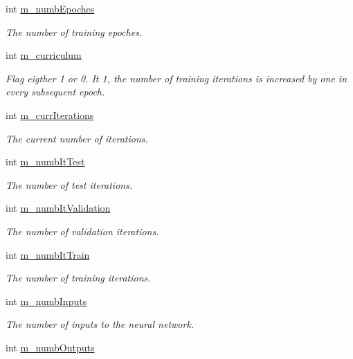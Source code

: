 \begin{DoxyCompactItemize}
int \hyperlink{classTrainingAlgorithm_aca4ca80f4bab494a8de2ea99c79b30d1}{m\+\_\+numb\+Epoches}
\begin{DoxyCompactList}\small\item\em The number of training epoches. \end{DoxyCompactList}\item 
int \hyperlink{classTrainingAlgorithm_ac00da5dcd2bf50277ef44e1543b9d919}{m\+\_\+curriculum}
\begin{DoxyCompactList}\small\item\em Flag eigther 1 or 0. It 1, the number of training iterations is increased by one in every subsequent epoch. \end{DoxyCompactList}\item 
int \hyperlink{classTrainingAlgorithm_a0b9caeb8ebd28c40838d1bd8b554d296}{m\+\_\+curr\+Iterations}
\begin{DoxyCompactList}\small\item\em The current number of iterations. \end{DoxyCompactList}\item 
int \hyperlink{classTrainingAlgorithm_a2f247e588d2c35a31f664a20b282ed8e}{m\+\_\+numb\+It\+Test}
\begin{DoxyCompactList}\small\item\em The number of test iterations. \end{DoxyCompactList}\item 
int \hyperlink{classTrainingAlgorithm_accfc8c76b580d4beb2c4a153ee2758da}{m\+\_\+numb\+It\+Validation}
\begin{DoxyCompactList}\small\item\em The number of validation iterations. \end{DoxyCompactList}\item 
int \hyperlink{classTrainingAlgorithm_ae41346aa8b69752db8db8a6ebbaeb375}{m\+\_\+numb\+It\+Train}
\begin{DoxyCompactList}\small\item\em The number of training iterations. \end{DoxyCompactList}\item 
int \hyperlink{classTrainingAlgorithm_a9b599ede34f6e22fb267f9056cb21925}{m\+\_\+numb\+Inputs}
\begin{DoxyCompactList}\small\item\em The number of inputs to the neural network. \end{DoxyCompactList}\item 
int \hyperlink{classTrainingAlgorithm_ad9c37bc8f0a93867bbb506a1dc2310f4}{m\+\_\+numb\+Outputs}

\end{DoxyCompactItemize}

